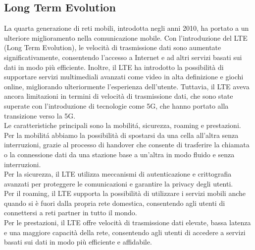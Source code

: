 \subsection{Long Term Evolution}
La quarta generazione di reti mobili, introdotta negli anni 2010, ha portato a un ulteriore miglioramento nella comunicazione mobile. Con l'introduzione del LTE (Long Term Evolution), le velocità di trasmissione dati sono aumentate significativamente, consentendo l'accesso a Internet e ad altri servizi basati sui dati in modo più efficiente. Inoltre, il LTE ha introdotto la possibilità di supportare servizi multimediali avanzati come video in alta definizione e giochi online, migliorando ulteriormente l'esperienza dell'utente. Tuttavia, il LTE aveva ancora limitazioni in termini di velocità di trasmissione dati, che sono state superate con l'introduzione di tecnologie come 5G, che hanno portato alla transizione verso la 5G.\\
Le caratteristiche principali sono la mobilitá, sicurezza, roaming e prestazioni.
Per la mobilitá abbiamo la possibilità di spostarsi da una cella all'altra senza interruzioni, grazie al processo di handover che consente di trasferire la chiamata o la connessione dati da una stazione base a un'altra in modo fluido e senza interruzioni.\\
Per la sicurezza, il LTE utilizza meccanismi di autenticazione e crittografia avanzati per proteggere le comunicazioni e garantire la privacy degli utenti.\\
Per il roaming, il LTE supporta la possibilità di utilizzare i servizi mobili anche quando si è
fuori dalla propria rete domestica, consentendo agli utenti di connettersi a reti partner in tutto il mondo.\\
Per le prestazioni, il LTE offre velocità di trasmissione dati elevate, bassa latenza e una maggiore capacità della rete, consentendo agli utenti di accedere a servizi basati sui dati in modo più efficiente e affidabile.\\

